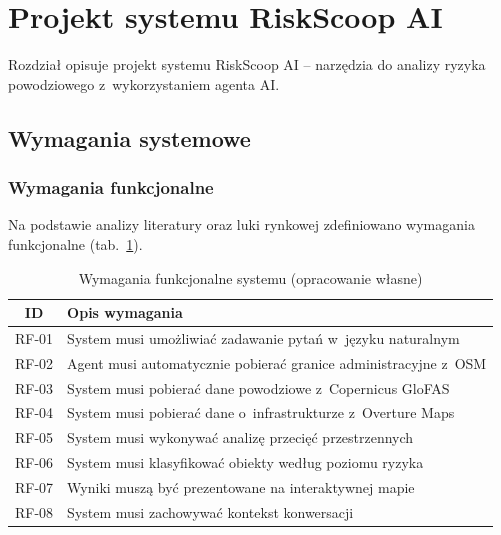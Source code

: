 \section{Projekt systemu RiskScoop AI}
\label{chap:projekt}

Rozdział opisuje projekt systemu RiskScoop AI -- narzędzia do analizy ryzyka powodziowego z~wykorzystaniem agenta AI.

\subsection{Wymagania systemowe}

\subsubsection{Wymagania funkcjonalne}

Na podstawie analizy literatury oraz luki rynkowej zdefiniowano wymagania funkcjonalne (tab.~\ref{tab:wymagania_funkcjonalne}).

\begin{table}[H]
    \centering
    \caption{Wymagania funkcjonalne systemu (opracowanie własne)}
    \begin{tabular}{|c|p{10cm}|}
        \hline
        \textbf{ID} & \textbf{Opis wymagania} \\
        \hline
        RF-01 & System musi umożliwiać zadawanie pytań w~języku naturalnym \\
        \hline
        RF-02 & Agent musi automatycznie pobierać granice administracyjne z~OSM \\
        \hline
        RF-03 & System musi pobierać dane powodziowe z~Copernicus GloFAS \\
        \hline
        RF-04 & System musi pobierać dane o~infrastrukturze z~Overture Maps \\
        \hline
        RF-05 & System musi wykonywać analizę przecięć przestrzennych \\
        \hline
        RF-06 & System musi klasyfikować obiekty według poziomu ryzyka \\
        \hline
        RF-07 & Wyniki muszą być prezentowane na interaktywnej mapie \\
        \hline
        RF-08 & System musi zachowywać kontekst konwersacji \\
        \hline
    \end{tabular}
    \label{tab:wymagania_funkcjonalne}
\end{table}

